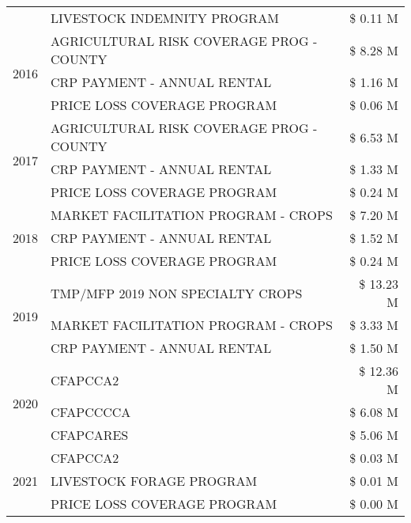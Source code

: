 \begin{tabular}{llr}
 & LIVESTOCK INDEMNITY PROGRAM & \$ 0.11 M \\
\cline{1-3}
\multirow[t]{3}{*}{2016} & AGRICULTURAL RISK COVERAGE PROG - COUNTY & \$ 8.28 M \\
 & CRP PAYMENT - ANNUAL RENTAL & \$ 1.16 M \\
 & PRICE LOSS COVERAGE PROGRAM & \$ 0.06 M \\
\cline{1-3}
\multirow[t]{3}{*}{2017} & AGRICULTURAL RISK COVERAGE PROG - COUNTY & \$ 6.53 M \\
 & CRP PAYMENT - ANNUAL RENTAL & \$ 1.33 M \\
 & PRICE LOSS COVERAGE PROGRAM & \$ 0.24 M \\
\cline{1-3}
\multirow[t]{3}{*}{2018} & MARKET FACILITATION PROGRAM - CROPS & \$ 7.20 M \\
 & CRP PAYMENT - ANNUAL RENTAL & \$ 1.52 M \\
 & PRICE LOSS COVERAGE PROGRAM & \$ 0.24 M \\
\cline{1-3}
\multirow[t]{3}{*}{2019} & TMP/MFP 2019 NON SPECIALTY CROPS & \$ 13.23 M \\
 & MARKET FACILITATION PROGRAM - CROPS & \$ 3.33 M \\
 & CRP PAYMENT - ANNUAL RENTAL & \$ 1.50 M \\
\cline{1-3}
\multirow[t]{3}{*}{2020} & CFAPCCA2 & \$ 12.36 M \\
 & CFAPCCCCA & \$ 6.08 M \\
 & CFAPCARES & \$ 5.06 M \\
\cline{1-3}
\multirow[t]{3}{*}{2021} & CFAPCCA2 & \$ 0.03 M \\
 & LIVESTOCK FORAGE PROGRAM & \$ 0.01 M \\
 & PRICE LOSS COVERAGE PROGRAM & \$ 0.00 M \\
\cline{1-3}
\bottomrule
\end{tabular}

